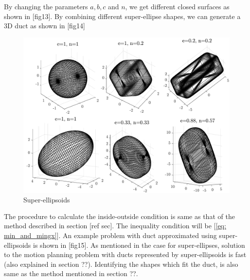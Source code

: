 \documentclass[12pt,a4]{article}
\begin{document}
By changing the parameters $a,b,c$ and $n$, we get different closed surfaces as shown in [fig13]. By combining different super-ellipse shapes, we can generate a 3D duct as shown in [fig14]

\begin{figure}[h!]
\centering
\includegraphics[scale=0.5]{figures/fig13.pdf}
\caption{ Super-ellipsoids \label{fig:SEs}}
\end{figure}

The procedure to calculate the inside-outside condition is same as that of the method described in section [ref sec]. The inequality condition will be [\ref{eq: min_and_mingx}]. An example problem with duct approximated using super-ellipsoids is shown in [fig15]. As mentioned in the case for super-ellipses, solution to the motion planning problem with ducts represented by super-ellipsoids is fast (also explained in section ??). Identifying the shapes which fit the duct, is also same as the method mentioned in section ??. 
\end{document}
